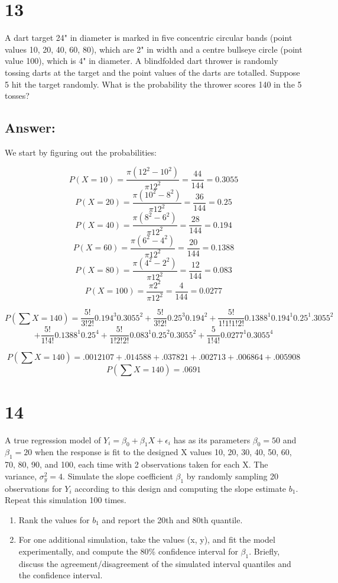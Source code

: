 \documentclass[svgnames]{article}
\begin{document}
\section*{13}
 A dart target 24" in diameter is marked in five concentric circular bands (point values 10, 20, 40, 60, 80), which are 2" in width and a centre bullseye circle (point value 100), which is 4" in diameter. A blindfolded dart thrower is randomly tossing darts at the target and the point values of the darts are totalled. Suppose 5 hit the target randomly. What is the probability the thrower scores 140 in the 5 tosses?

\subsection*{Answer:}
We start by figuring out the probabilities:

$$P(X=10) = \frac{\pi (12^2-10^2)}{\pi 12^2} = \frac{44}{144} = 0.3055$$
$$P(X=20) = \frac{\pi (10^2-8^2)}{\pi 12^2} = \frac{36}{144} = 0.25$$
$$P(X=40) = \frac{\pi (8^2-6^2)}{\pi 12^2} = \frac{28}{144} = 0.194$$
$$P(X=60) = \frac{\pi (6^2-4^2)}{\pi 12^2} = \frac{20}{144} = 0.1388$$
$$P(X=80) = \frac{\pi (4^2-2^2)}{\pi 12^2} = \frac{12}{144} = 0.083$$
$$P(X=100) = \frac{\pi 2^2}{\pi 12^2} = \frac{4}{144} = 0.0277$$

$$P(\sum X=140) =  \frac{5!}{3!2!}0.194^3 0.3055^2+ \frac{5!}{3!2!}0.25^3 0.194^2 + \frac{5!}{1!1!1!2!}0.1388^1 0.194^1 0.25^1 .3055^2$$%
$$+ \frac{5!}{1!4!}0.1388^1 0.25^4 + \frac{5!}{1!2!2!}0.083^1 0.25^2 0.3055^2 +\frac{5}{1!4!}0.0277^1 0.3055^4$$ %

$$P(\sum X=140) = .0012107 + .014588 + .037821 + .002713 + .006864 + .005908$$
$$P(\sum X=140) = .0691$$

\section*{14}
A true regression model of $Y_i = \beta_0+\beta_1X + \epsilon_i $ has as its parameters $ \beta_0 = 50$ and $ \beta_1 = 20$ 
when the response is fit to the designed X values 10, 20, 30, 40, 50, 60, 70, 80, 90, and 100, each time with 2 observations taken for each X. The variance, $\sigma_y^2 = 4$. Simulate the slope coefficient $\beta_1$ by randomly sampling 20 observations for $Y_i$ according to this design and computing the slope estimate $b_1$. Repeat this simulation 100 times. 
\begin{enumerate}
\item 
Rank the values for $b_1$ and report the 20th and 80th quantile. 
\item
For one additional simulation, take the values (x, y), and fit the model experimentally, and compute the 80\% confidence interval for $\beta_1$. Briefly, discuss the agreement/disagreement of the simulated interval quantiles and the confidence interval.
\end{enumerate}
\end{document}
